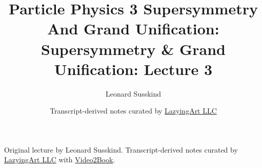\documentclass[11pt,oneside]{book}
\begin{document}
\frontmatter
\title{Particle Physics 3 Supersymmetry And Grand Unification: Supersymmetry \& Grand Unification: Lecture 3}
\author{Leonard Susskind}
\date{Transcript-derived notes curated by \href{https://lazying.art}{LazyingArt LLC}}
\maketitle
\begin{center}
\small Original lecture by Leonard Susskind. Transcript-derived notes curated by \href{https://lazying.art}{LazyingArt LLC} with \href{https://github.com/lachlanchen/Video2Book}{Video2Book}.
\end{center}
\clearpage
\mainmatter

\end{document}
